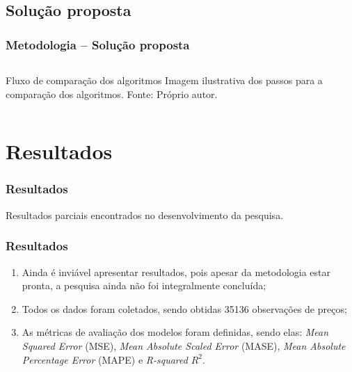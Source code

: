 \documentclass[aspectratio=169]{beamer}
\begin{document}
\subsection{Solução proposta}
\begin{frame}[fragile]
	\frametitle{Metodologia -- Solução proposta}
		\begin{columns}[c]
			\begin{column}{1\linewidth}
				\begin{figure}
					\label{fig:proposta}
				\end{figure}

				\begin{block}{Fluxo de comparação dos algoritmos}
					Imagem ilustrativa dos passos para a comparação dos algoritmos. Fonte: Próprio autor.    
				\end{block}
			\end{column}
		\end{columns}
	\end{frame}


\section{Resultados}

\begin{frame} \frametitle{Resultados}
	\begin{center}
		Resultados parciais encontrados no desenvolvimento da pesquisa.
\end{center}
\end{frame}

\begin{frame}[fragile] \frametitle{Resultados}
	\begin{enumerate}
		\item Ainda é inviável apresentar resultados, pois apesar da metodologia estar pronta, a pesquisa ainda não foi integralmente concluída;
		
		\item Todos os dados foram coletados, sendo obtidas 35136 observações de preços;
		
		\item As métricas de avaliação dos modelos foram definidas, sendo elas: \textit{Mean Squared Error} (MSE), \textit{Mean Absolute Scaled Error} (MASE), \textit{Mean Absolute Percentage Error} (MAPE) e \textit{R-squared} ${R^2}$.
	\end{enumerate}
\end{frame}
\end{document}

